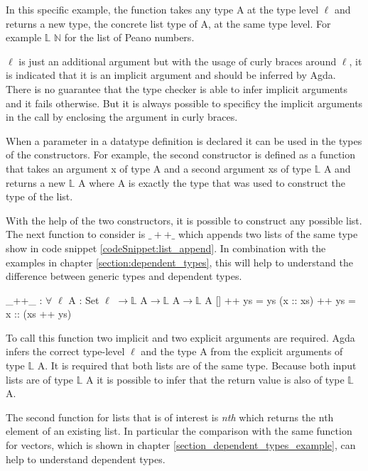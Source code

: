 In this specific example, the function takes any type A at the type level $\ell$ and returns a new type, the concrete list type of A, at the same type level.
For example $\mathbb{L}$ $\mathbb{N}$ for the list of Peano numbers.

$\ell$ is just an additional argument but with the usage of curly braces around $\ell$, it is indicated that it is an implicit argument and should be inferred by Agda.
There is no guarantee that the type checker is able to infer implicit arguments and it fails otherwise.
But it is always possible to specificy the implicit arguments in the call by enclosing the argument in curly braces\cite{norell:deptyped}.

When a parameter in a datatype definition is declared it can be used in the types of the constructors. 
For example, the second constructor is defined as a function that takes an argument x of type A and a second argument xs of type $\mathbb{L}$ A and returns a new $\mathbb{L}$ A where A is exactly the type that was used to construct the type of the list.

With the help of the two constructors, it is possible to construct any possible list. 
The next function to consider is $\_++\_$ which appends two lists of the same type show in code snippet \ref{codeSnippet:list_append}. 
In combination with the examples in chapter \ref{section:dependent_types}, this will help to understand the difference between generic types and dependent types.

\begin{codesnippet}[mathescape=true, caption={Definition of the list append function in Agda}, label={codeSnippet:list_append}]
_++_ : $\forall$ {$\ell$} {A : Set $\ell$} $\rightarrow \mathbb{L}$ A$\rightarrow \mathbb{L}$ A$\rightarrow \mathbb{L}$ A
  []        ++ ys = ys
  (x :: xs) ++ ys = x :: (xs ++ ys)
\end{codesnippet}

To call this function two implicit and two explicit arguments are required. 
Agda infers the correct type-level $\ell$ and the type A from the explicit arguments of type $\mathbb{L}$ A. 
It is required that both lists are of the same type. 
Because both input lists are of type $\mathbb{L}$ A it is possible to infer that the return value is also of type $\mathbb{L}$ A.

The second function for lists that is of interest is \emph{nth} which returns the nth element of an existing list.
In particular the comparison with the same function for vectors, which is shown in chapter \ref{section_dependent_types_example}, can help to understand dependent types.

